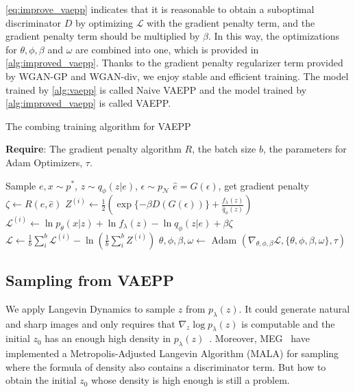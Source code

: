 \cref{eq:improve_vaepp} indicates that it is reasonable to obtain a suboptimal discriminator $D$ by optimizing $\mathcal{L}$ with the gradient penalty term, and the gradient penalty term should be multiplied by $\beta$. In this way, the optimizations for $\theta, \phi, \beta$ and $\omega$ are combined into one, which is provided in \cref{alg:improved_vaepp}. 
Thanks to the gradient penalty regularizer term provided by WGAN-GP and WGAN-div, we enjoy stable and efficient training. The model trained by \cref{alg:vaepp} is called Naive VAEPP and the model trained by \cref{alg:improved_vaepp} is called VAEPP. 
\begin{algorithm}[tb]
\caption{The combing training algorithm for VAEPP}
\label{alg:improved_vaepp}
\textbf{Require}: The gradient penalty algorithm $R$, the batch size $b$, the parameters for Adam Optimizers, $\tau$. 

\begin{algorithmic}[1] %
\STATE Sample $e, x \sim p^*$, $z \sim q_\phi(z|e)$, $\epsilon \sim p_\mathcal{N}$
\STATE $\hat{e} = G(\epsilon)$, get gradient penalty $\zeta \gets R(e, \hat{e})$ 
\STATE $Z^{(i)} \gets \frac{1}{2}(\exp\{-\beta D(G(\epsilon))\} + \frac{f_\lambda(z)}{\hat{q}_\phi(z)})$
\STATE $\mathcal{L}^{(i)} \gets \ln p_\theta(x|z) + \ln f_\lambda(z) - \ln q_\phi(z|e) + \beta \zeta$
\ENDFOR
\STATE $\mathcal{L} \gets \frac{1}{b}\sum_{i}^b \mathcal{L}^{(i)} - \ln (\frac{1}{b}\sum_{i}^b Z^{(i)})$
\STATE $\theta, \phi, \beta, \omega \gets $ Adam $(\nabla_{\theta, \phi, \beta} \mathcal{L}, \{\theta, \phi, \beta, \omega\}, \tau)$
\ENDWHILE
\end{algorithmic}
\end{algorithm}

\subsection{Sampling from VAEPP}
We apply Langevin Dynamics to sample $z$ from $p_\lambda(z)$. It could generate natural and sharp images and only requires that $\nabla_z \log p_\lambda(z)$ is computable and the initial $z_0$ has an enough high density in $p_\lambda(z)$~\cite{song2019generative}. 
Moreover, MEG~\cite{kumar2019maximum} have implemented a Metropolis-Adjusted Langevin Algorithm (MALA) for sampling where the formula of density also contains a discriminator term. But how to obtain the initial $z_0$ whose density is high enough is still a problem. 

